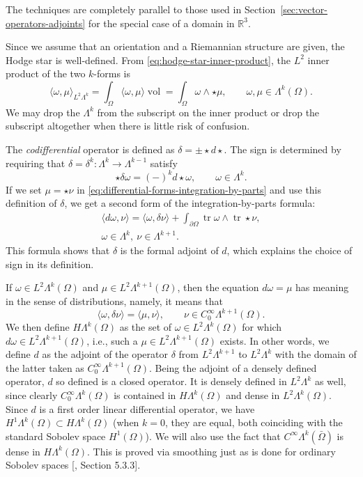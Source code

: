 {The techniques are completely parallel to those used in Section~\ref{sec:vector-operators-adjoints} for the special case of a domain in $\mathbb R^3$.}

{Since we assume that an orientation and a Riemannian structure are given, the Hodge star is well-defined. From \eqref{eq:hodge-star-inner-product}, the $L^2$ inner product of the two $k$-forms is}
\[
\langle\omega,\mu\rangle_{L^2\Lambda^k}=\int_\Omega\langle\omega,\mu\rangle\operatorname{vol}=\int_\Omega\omega\wedge\star\mu,\qquad\omega,\mu\in\Lambda^k(\Omega).
\]
{We may drop the $\Lambda^k$ from the subscript on the inner product or drop the subscript altogether when there is little risk of confusion.}

{The \emph{codifferential} operator is defined as $\delta=\pm\star d\star$. The sign is determined by requiring that $\delta=\delta^k:\Lambda^k\to\Lambda^{k-1}$ satisfy}
\[
\star\delta\omega=(-)^kd\star\omega,\qquad\omega\in\Lambda^k.
\]
{If we set $\mu=\star\nu$ in \eqref{eq:differential-forms-integration-by-parts} and use this definition of $\delta$, we get a second form of the integration-by-parts formula:}
\[
\begin{gathered}
\langle d\omega,\nu\rangle=\langle\omega,\delta\nu\rangle+\int_{\partial\Omega}\operatorname{tr}\omega\wedge\operatorname{tr}\star\nu,\\
\omega\in\Lambda^k,\ \nu\in\Lambda^{k+1}.
\end{gathered}
\]
{This formula shows that $\delta$ is the formal adjoint of $d$, which explains the choice of sign in its definition.}

{If $\omega\in L^2\Lambda^k(\Omega)$ and $\mu\in L^2\Lambda^{k+1}(\Omega)$, then the equation $d\omega=\mu$ has meaning in the sense of distributions, namely, it means that}
\[
\langle\omega,\delta\nu\rangle=\langle\mu,\nu\rangle,\qquad\nu\in C_0^\infty\Lambda^{k+1}(\Omega).
\]
{We then define $H\Lambda^k(\Omega)$ as the set of $\omega\in L^2\Lambda^k(\Omega)$ for which $d\omega\in L^2\Lambda^{k+1}(\Omega)$, i.e., such a $\mu\in L^2\Lambda^{k+1}(\Omega)$ exists. In other words, we define $d$ as the adjoint of the operator $\delta$ from $L^2\Lambda^{k+1}$ to $L^2\Lambda^k$ with the domain of the latter taken as $C_0^\infty\Lambda^{k+1}(\Omega)$. Being the adjoint of a densely defined operator, $d$ so defined is a closed operator. It is densely defined in $L^2\Lambda^k$ as well, since clearly $C_0^\infty\Lambda^k(\Omega)$ is contained in $H\Lambda^k(\Omega)$ and dense in $L^2\Lambda^k(\Omega)$. Since $d$ is a first order linear differential operator, we have $H^1\Lambda^k(\Omega)\subset H\Lambda^k(\Omega)$ (when $k=0$, they are equal, both coinciding with the standard Sobolev space $H^1(\Omega)$). We will also use the fact that $C^\infty\Lambda^k(\bar\Omega)$ is dense in $H\Lambda^k(\Omega)$. This is proved via smoothing just as is done for ordinary Sobolev spaces [, Section 5.3.3].}

